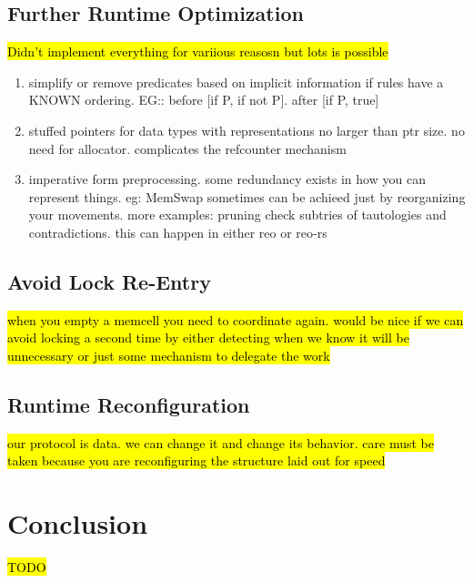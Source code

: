 \subsection{Further Runtime Optimization}
\hl{Didn't implement everything for variious reasosn but lots is possible}
\begin{enumerate}
	\item simplify or remove predicates based on implicit information if rules have a KNOWN ordering. EG:: before [if P, if not P]. after [if P, true]
	\item stuffed pointers for data types with representations no larger than ptr size. no need for allocator. complicates the refcounter mechanism
	\item imperative form preprocessing. some redundancy exists in how you can represent things. eg: MemSwap sometimes can be achieed just by reorganizing your movements. more examples: pruning check subtries of tautologies and contradictions. this can happen in either reo or reo-rs
\end{enumerate}
\subsection{Avoid Lock Re-Entry}
\hl{when you empty a memcell you need to coordinate again. would be nice if we can avoid locking a second time by either detecting when we know it will be unnecessary or just some mechanism to delegate the work}
\subsection{Runtime Reconfiguration}
\hl{our protocol is data. we can change it and change its behavior. care must be taken because you are reconfiguring the structure laid out for speed}
\section{Conclusion}
\hl{TODO}